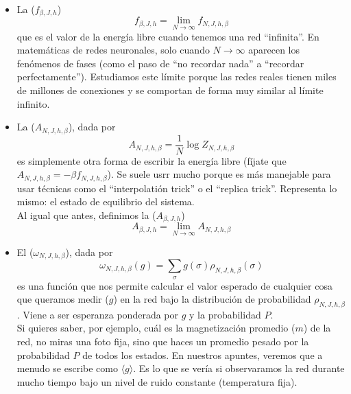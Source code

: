 \begin{itemize}
    \item La  ($f_{\beta, J, h}$)
    \begin{equation*}
        f_{\beta,J,h} = \lim_{N \to \infty} f_{N,J,h,\beta}    
    \end{equation*}
    que es el valor de la energía libre cuando tenemos una red ``infinita''. En matemáticas de redes neuronales, solo cuando $N \to \infty$ aparecen los fenómenos de fases (como el paso de ``no recordar nada'' a ``recordar perfectamente''). Estudiamos este límite porque las redes reales tienen miles de millones de conexiones y se comportan de forma muy similar al límite infinito.
    \item La  ($A_{N,J,h,\beta}$), dada por 
    \begin{equation*}
        A_{N,J,h,\beta} = \frac{1}{N} \log Z_{N,J,h,\beta}
    \end{equation*}
    es simplemente otra forma de escribir la energía libre (fíjate que $A_{N,J,h,\beta} = -\beta f_{N,J,h,\beta}$). Se suele usrr mucho porque es más manejable para usar técnicas como el ``interpolatión trick'' o el ``replica trick''. Representa lo mismo: el estado de equilibrio del sistema. \\
    \noindent
    Al igual que antes, definimos la  ($A_{\beta,J,h}$)
    \begin{equation*}
        A_{\beta,J,h} = \lim_{N \to \infty} A_{N,J,h,\beta}
    \end{equation*}
    \item El  ($\omega_{N,J,h,\beta}$), dada por
    \begin{equation*}
        \omega_{N,J,h,\beta}(g) = \sum_{\sigma} g(\sigma) \rho_{N,J,h,\beta}(\sigma)
    \end{equation*}
    es una función que nos permite calcular el valor esperado de cualquier cosa que queramos medir ($g$) en la red bajo la distribución de probabilidad $\rho_{N,J,h,\beta}$. Viene a ser esperanza ponderada por $g$ y la probabilidad $P$. \\
    \noindent
    Si quieres saber, por ejemplo, cuál es la magnetización promedio ($m$) de la red, no miras una foto fija, sino que haces un promedio pesado por la probabilidad $P$ de todos los estados. En nuestros apuntes, veremos que a menudo se escribe como $\langle g \rangle$. Es lo que se vería si observaramos la red durante mucho tiempo bajo un nivel de ruido constante (temperatura fija).
\end{itemize}

